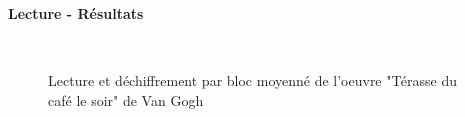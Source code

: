 \documentclass{beamer}
\begin{document}
\begin{frame}[t]
\begin{columns}[t]
\begin{column}{.49\linewidth}
\begin{block}{\centering \textbf{Lecture - Résultats}}
\begin{figure}[t]
\begin{center}
                            \hspace{.05\linewidth}
                            \hspace{.05\linewidth}
                            \\
                            \caption{Lecture et déchiffrement par bloc moyenné de l'oeuvre "Térasse du café le soir" de Van Gogh}
                        \end{center}
                    \end{figure}
                \end{block}

                \vspace{1cm}



\end{column}
\end{columns}
\end{frame}
\end{document}
